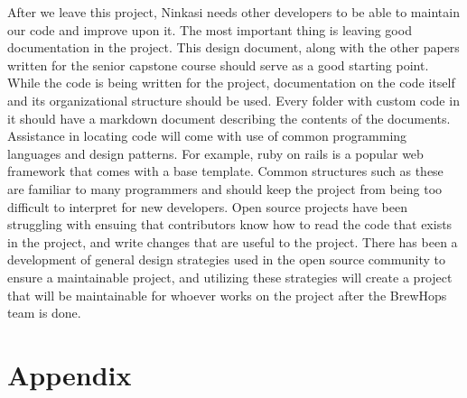 \documentclass[draftclsnofoot,onecolumn,letterpaper,10pt]{IEEEtran}
\begin{document}
		After we leave this project, Ninkasi needs other developers to be able to maintain our code and improve upon it.
		The most important thing is leaving good documentation in the project.
		This design document, along with the other papers written for the senior capstone course should serve as a good starting point.
		While the code is being written for the project, documentation on the code itself and its organizational structure should be used.
		Every folder with custom code in it should have a markdown document describing the contents of the documents.
		Assistance in locating code will come with use of common programming languages and design patterns.
		For example, ruby on rails is a popular web framework that comes with a base template.
		Common structures such as these are familiar to many programmers and should keep the project from being too difficult to interpret for new developers.
		Open source projects have been struggling with ensuing that contributors know how to read the code that exists in the project, and write changes that are useful to the project.
		There has been a development of general design strategies used in the open source community to ensure a maintainable project, and utilizing these strategies will create a project that will be maintainable for whoever works on the project after the BrewHops team is done.


		\section{Appendix}
\end{document}

